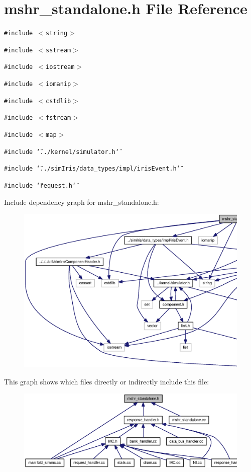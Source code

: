 \section{mshr\_\-standalone.h File Reference}
\label{mshr__standalone_8h}
{\tt \#include $<$string$>$}\par
{\tt \#include $<$sstream$>$}\par
{\tt \#include $<$iostream$>$}\par
{\tt \#include $<$iomanip$>$}\par
{\tt \#include $<$cstdlib$>$}\par
{\tt \#include $<$fstream$>$}\par
{\tt \#include $<$map$>$}\par
{\tt \#include \char`\"{}../kernel/simulator.h\char`\"{}}\par
{\tt \#include \char`\"{}../simIris/data\_\-types/impl/irisEvent.h\char`\"{}}\par
{\tt \#include \char`\"{}request.h\char`\"{}}\par


Include dependency graph for mshr\_\-standalone.h:\nopagebreak
\begin{figure}[H]
\begin{center}
\leavevmode
\includegraphics[width=420pt]{mshr__standalone_8h__incl}
\end{center}
\end{figure}


This graph shows which files directly or indirectly include this file:\nopagebreak
\begin{figure}[H]
\begin{center}
\leavevmode
\includegraphics[width=318pt]{mshr__standalone_8h__dep__incl}
\end{center}
\end{figure}
